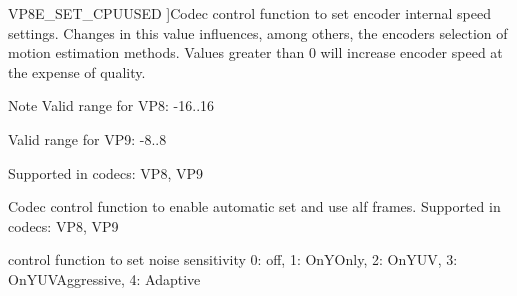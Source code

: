 \begin{Desc}
\begin{description}
{V\+P8\+E\+\_\+\+S\+E\+T\+\_\+\+C\+P\+U\+U\+S\+ED\hypertarget{group__vp8__encoder_gga6deae3d561c838952552c3d3756322eca953ff0eaa2fcdc2ecd627e449b026853}{}\label{group__vp8__encoder_gga6deae3d561c838952552c3d3756322eca953ff0eaa2fcdc2ecd627e449b026853}
}]Codec control function to set encoder internal speed settings. Changes in this value influences, among others, the encoder\textquotesingle{}s selection of motion estimation methods. Values greater than 0 will increase encoder speed at the expense of quality.

\begin{DoxyNote}{Note}
Valid range for V\+P8\+: -\/16..16 

Valid range for V\+P9\+: -\/8..8
\end{DoxyNote}
Supported in codecs\+: V\+P8, V\+P9 \item[{\em 
V\+P8\+E\+\_\+\+S\+E\+T\+\_\+\+E\+N\+A\+B\+L\+E\+A\+U\+T\+O\+A\+L\+T\+R\+EF\hypertarget{group__vp8__encoder_gga6deae3d561c838952552c3d3756322eca24a5530efabb8b4949d01622b1d72cb0}{}\label{group__vp8__encoder_gga6deae3d561c838952552c3d3756322eca24a5530efabb8b4949d01622b1d72cb0}
}]Codec control function to enable automatic set and use alf frames. Supported in codecs\+: V\+P8, V\+P9 \item[{\em 
V\+P8\+E\+\_\+\+S\+E\+T\+\_\+\+N\+O\+I\+S\+E\+\_\+\+S\+E\+N\+S\+I\+T\+I\+V\+I\+TY\hypertarget{group__vp8__encoder_gga6deae3d561c838952552c3d3756322eca3fa90cb70bade72af3c2d8d91471a36c}{}\label{group__vp8__encoder_gga6deae3d561c838952552c3d3756322eca3fa90cb70bade72af3c2d8d91471a36c}
}]control function to set noise sensitivity 0\+: off, 1\+: On\+Y\+Only, 2\+: On\+Y\+UV, 3\+: On\+Y\+U\+V\+Aggressive, 4\+: Adaptive


\end{description}
\end{Desc}
